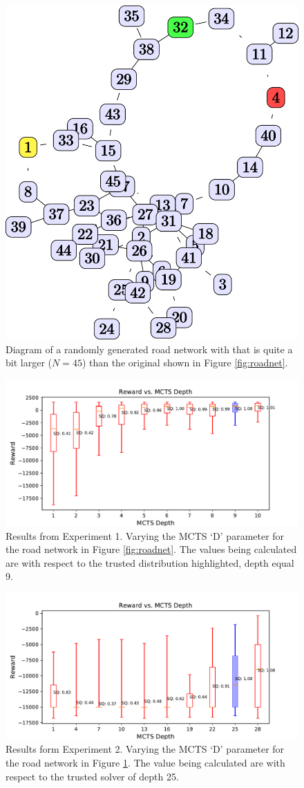 \begin{figure}[tbp]
    \centering
    \includegraphics[width=0.4\linewidth]{Figures/medium_roadnet.png}
    \caption{Diagram of a randomly generated road network with that is quite a bit larger ($N=45$) than the original shown in Figure \ref{fig:roadnet}.}
    \label{fig:med_roadnet}
\end{figure}

\begin{figure}[tbp]
    \centering
    \includegraphics[width=1.0\linewidth]{Figures/sq_roadnet_mcts_i100e1000.pdf}
    \caption{Results from Experiment 1. Varying the MCTS `D' parameter for the road network in Figure \ref{fig:roadnet}. The \xQ{} values being calculated are with respect to the trusted distribution highlighted, depth equal 9.}
    \label{fig:mcts_d}
\end{figure}
\begin{figure}[tbp]
    \centering
    \includegraphics[width=1.0\linewidth]{Figures/sq_mednet_mcts_i1000e2000.pdf}
    \caption{Results form Experiment 2. Varying the MCTS `D' parameter for the road network in Figure \ref{fig:med_roadnet}. The \xQ{} value being calculated are with respect to the trusted solver of depth 25.}
    \label{fig:mcts_d_med}
\end{figure}


